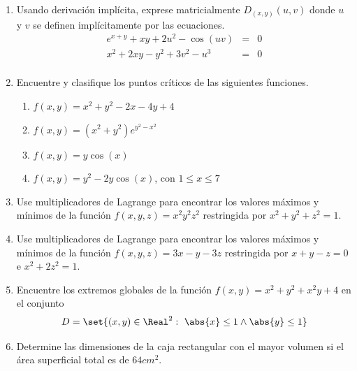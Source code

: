 \documentclass{article}
\begin{document}
\begin{enumerate}
    \begin{enumerate}
      \item $x^2-y^2+xz^2=1$
      \item $e^z=xyz$
      \item $yz+x\ln(y)=z^2$
    \end{enumerate}
  \vspace{2mm}
  \item Usando derivación implícita, exprese matricialmente $D_{(x,y)}(u,v)$ donde $u$ y $v$ se definen implícitamente por las ecuaciones.
    $$\begin{array}{rcl}
      e^{x+y}+xy+2u^2-\cos(uv) & = & 0\\
      x^2+2xy-y^2+3v^2-u^3     & = & 0\\
    \end{array}$$
  \vspace{2mm}
  \item Encuentre y clasifique los puntos críticos de las siguientes funciones.
    \begin{enumerate}
      \item $f(x,y)=x^2+y^2-2x-4y+4$
      \item $f(x,y)=(x^2+y^2)e^{y^2-x^2}$
      \item $f(x,y)=y\cos(x)$
      \item $f(x,y)=y^2-2y\cos(x)$, con $1\leq x\leq 7$
    \end{enumerate}
  \vspace{2mm}
  \item Use multiplicadores de Lagrange para encontrar los valores máximos y mínimos de la función $f(x,y,z)=x^2y^2z^2$ restringida por $x^2+y^2+z^2=1$.
  \vspace{2mm}
  \item Use multiplicadores de Lagrange para encontrar los valores máximos y mínimos de la función $f(x,y,z)=3x-y-3z$ restringida por $x+y-z=0$ e $x^2+2z^2=1$.
  \vspace{2mm}
  \item Encuentre los extremos globales de la función $f(x,y)=x^2+y^2+x^2y+4$ en el conjunto 
    $$D=\set{(x,y)\in\Real^2:\ \abs{x}\leq 1\wedge\abs{y}\leq 1}$$
  \item Determine las dimensiones de la caja rectangular con el mayor volumen si el área superficial total es de $64cm^2$.
\end{enumerate}
\end{document}
